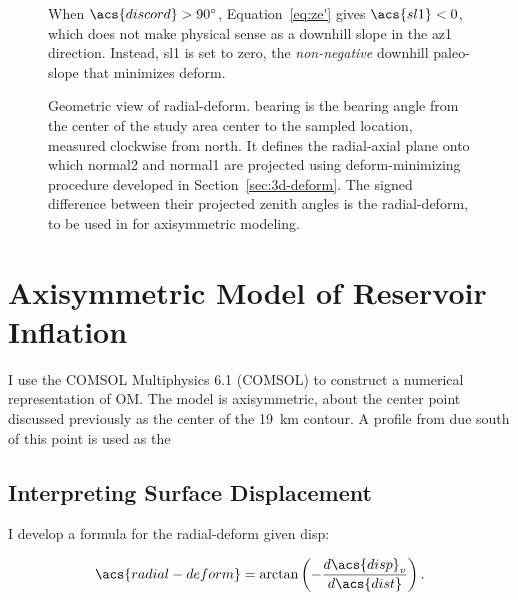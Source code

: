 \begin{figure}
    {\caption[Reversal case: $\acs{discord}>\ang{90}$]{When $\acs{discord}>\ang{90}$, Equation~\eqref{eq:ze'} gives $\acs{sl1}<0$, which does not make physical sense as a downhill slope in the \acs{az1} direction. Instead, \acs{sl1} is set to zero, the \emph{non-negative} downhill paleo-slope that minimizes \acs{deform}.}\label{fig:reversal}}
    {\hspace*{-0.4\linewidth}}
    \vspace*{-9em}
    {\caption[Calculation of \acf{radial-deform}]{Geometric view of \acl{radial-deform}. \acs{bearing} is the bearing angle from the center of the study area \acs{center} to the sampled location, measured clockwise from \acf{north}. It defines the radial-axial plane onto which \acs{normal2} and \acs{normal1} are projected using \acs{deform}-minimizing procedure developed in Section~\ref{sec:3d-deform}. The signed difference between their projected zenith angles is the \acf{radial-deform}, to be used in for axisymmetric modeling.}\label{fig:radial}}
    {}
\end{figure}

\section{Axisymmetric Model of Reservoir Inflation}

I use the COMSOL Multiphysics 6.1 (COMSOL) to construct a numerical representation of \acf{OM}. The model is axisymmetric, about the center point discussed previously as the center of the \qty{19}{\km} contour. A profile from due south of this point is used as the 

\subsection{Interpreting Surface Displacement}

I develop a formula for the \acf{radial-deform} given \acf{disp}:

\begin{equation}
    \acs{radial-deform} = \arctan\left(-\frac{d\acs{disp}_v}{d\acs{dist}}\right).\nonumber
\end{equation}

